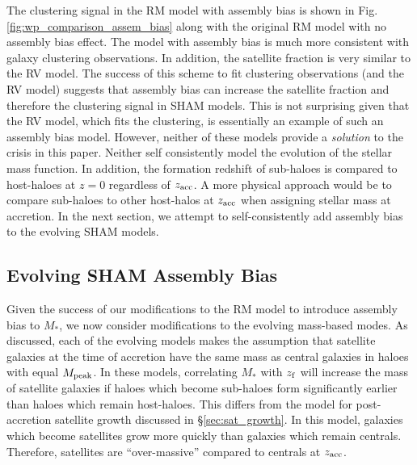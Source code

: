 \documentclass[useAMS,fleqn,usenatbib]{mnras}
\begin{document}
The clustering signal in the RM model with assembly bias is shown in Fig. \ref{fig:wp_comparison_assem_bias} along with the original RM model with no assembly bias effect.  The model with assembly bias is much more consistent with galaxy clustering observations.  In addition, the satellite fraction is very similar to the RV model.  The success of this scheme to fit clustering observations (and the RV model) suggests that assembly bias can increase the satellite fraction and therefore the clustering signal in SHAM models. This is not surprising given that the RV model, which fits the clustering, is essentially an example of such an assembly bias model.  However, neither of these models provide a {\em solution} to the crisis in this paper.  Neither self consistently model the evolution of the stellar mass function.  In addition, the formation redshift of sub-haloes is compared to host-haloes at $z=0$ regardless of $z_{\rm acc}$.  A more physical approach would be to compare sub-haloes to other host-halos at $z_{\rm acc}$ when assigning stellar mass at accretion. In the next section, we attempt to self-consistently add assembly bias to the evolving SHAM models.    

\subsection{Evolving SHAM Assembly Bias}

Given the success of our modifications to the RM model to introduce assembly bias to $M_*$, we now consider modifications to the evolving mass-based modes.  As discussed, each of the evolving models makes the assumption that satellite galaxies at the time of accretion have the same mass as central galaxies in haloes with equal $M_{\rm peak}$.  In these models, correlating $M_*$ with $z_{\rm f}$ will increase the mass of satellite galaxies if haloes which become sub-haloes form significantly earlier than haloes which remain host-haloes.  This differs from the model for post-accretion satellite growth discussed in \S \ref{sec:sat_growth}.  In this model, galaxies which become satellites grow more quickly than galaxies which remain centrals.  Therefore, satellites are ``over-massive'' compared to centrals at $z_{\rm acc}$. 
\end{document}
